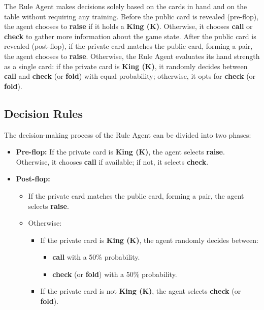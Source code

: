 \documentclass{article}
\begin{document}
The Rule Agent makes decisions solely based on the cards in hand and on the table without requiring any training. Before the public card is revealed (pre-flop), the agent chooses to \textbf{raise} if it holds a \textbf{King (K)}. Otherwise, it chooses \textbf{call} or \textbf{check} to gather more information about the game state. After the public card is revealed (post-flop), if the private card matches the public card, forming a pair, the agent chooses to \textbf{raise}. Otherwise, the Rule Agent evaluates its hand strength as a single card: if the private card is \textbf{King (K)}, it randomly decides between \textbf{call} and \textbf{check} (or \textbf{fold}) with equal probability; otherwise, it opts for \textbf{check} (or \textbf{fold}).

\subsection{Decision Rules}

The decision-making process of the Rule Agent can be divided into two phases:
\begin{itemize}
    \item \textbf{Pre-flop:} If the private card is \textbf{King (K)}, the agent selects \textbf{raise}. Otherwise, it chooses \textbf{call} if available; if not, it selects \textbf{check}.
    \item \textbf{Post-flop:} 
    \begin{itemize}
        \item If the private card matches the public card, forming a pair, the agent selects \textbf{raise}.
        \item Otherwise:
        \begin{itemize}
            \item If the private card is \textbf{King (K)}, the agent randomly decides between:
            \begin{itemize}
                \item \textbf{call} with a 50\% probability.
                \item \textbf{check} (or \textbf{fold}) with a 50\% probability.
            \end{itemize}
            \item If the private card is not \textbf{King (K)}, the agent selects \textbf{check} (or \textbf{fold}).
        \end{itemize}
    \end{itemize}
\end{itemize}
\end{document}
